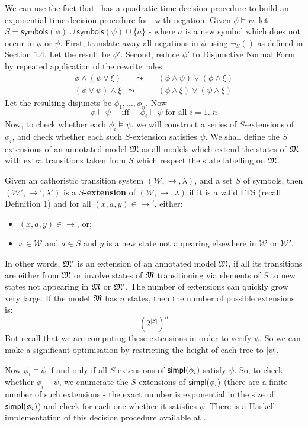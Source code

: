 \NI We can use the fact that \cathoristic\ has a quadratic-time
decision procedure to build an exponential-time decision procedure for
\cathoristic\ with negation.  Given $\phi \models \psi$, let $S =
\mathsf{symbols}(\phi) \cup \mathsf{symbols}(\psi) \cup \{a\}$ - where
$a$ is a new symbol which does not occur in $\phi$ or $\psi$.  First,
translate away all negations in $\phi$ using $\neg_S()$ as defined in
Section 1.4.  Let the result be $\phi'$.  Second, reduce $\phi'$ to
Disjunctive Normal Form by repeated application of the rewrite rules:
\begin{eqnarray*}
\phi \land (\psi \lor \xi) & \quad \leadsto \quad& (\phi \land \psi) \lor (\phi \land \xi)  \\
(\phi \lor \psi) \land \xi & \leadsto & (\phi \land \xi) \lor (\psi \land \xi) 
\end{eqnarray*}
Let the resulting disjuncts be $\phi_1, ..., \phi_n$. 
Now 
\[
\phi \models \psi \quad\text{ iff }\quad \phi_i \models \psi \text{ for all } i = 1 .. n
\]
Now, to check whether each $\phi_i \models \psi$, 
we will construct a series of $S$-extensions of $\phi_i$, and check whether each such $S$-extension satisfies $\psi$.
We shall define the $S$ extensions of
an annotated model $\frak{M}$ as all models which extend the states of
$\frak{M}$ with extra transitions taken from $S$ which respect the state
labelling on $\frak{M}$.  
\begin{definition}
Given an cathoristic transition system $(\mathcal{W},\rightarrow,\lambda)$,  and a set $S$ of symbols, then $(\mathcal{W'},\rightarrow',\lambda')$ is a {\bf $S$-extension} of $(\mathcal{W},\rightarrow,\lambda)$ if it is a valid LTS (recall Definition 1) and for all $(x,a,y) \in \rightarrow'$, either:
\begin{itemize} 
\item
$(x, a, y) \in \rightarrow$,  or;
\item
 $x \in \mathcal{W}$ and $a \in S$ and $y$ is a new state not appearing elsewhere in $\mathcal{W}$ or $\mathcal{W'}$.
\end{itemize}
\end{definition}
In other words, $\frak{M}'$ is an extension of an annotated model $\frak{M}$, if all its transitions are either from $\frak{M}$ or involve states of $\frak{M}$ transitioning via elements of $S$ to new states not appearing in $\frak{M}$ or $\frak{M}'$.
The number of extensions can quickly grow very large.
If the model $\frak{M}$ has $n$ states, then the number of possible extensions is:
\[
({2^{|S|}})^n
\] 
But recall that we are computing these extensions in order to verify $\psi$. So we can make a significant optimisation by restricting the height of each tree to $|\psi|$.

Now $\phi_i \models \psi$ if and only if all $S$-extensions of $\mathsf{simpl}(\phi_i)$ satisfy $\psi$.  
So, to check
whether $\phi_i \models \psi$, we enumerate the $S$-extensions of
$\mathsf{simpl}(\phi_i)$ (there are a finite number of such extensions - the
exact number is exponential in the size of $\mathsf{simpl}(\phi_i)$) and check
for each one whether it satisfies $\psi$.
There is a Haskell implementation of this decision procedure available at \cite{HaskellImplementation}.
